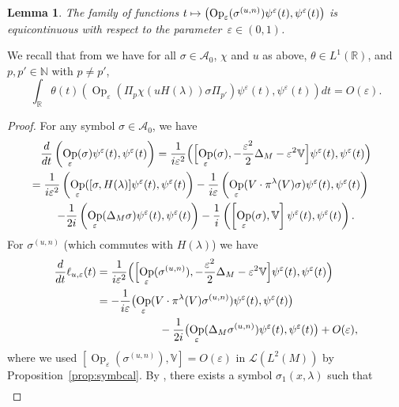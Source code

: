 \documentclass[JEP,XML,SOM,Unicode,published]{cedram}
\let\mathcal\mathscr
\newcommand\mto{\mathchoice{\longmapsto}{\mapsto}{\mapsto}{\mapsto}}
\DeclareMathOperator{\Op}{Op}
\theoremstyle{plain}
\newtheorem{lemma}[theorem]{Lemma}
\theoremstyle{definition}
\let\eps\varepsilon
\def\R{{\mathbb R}}
\def\N{{\mathbb N}}
\def\bbV{{\mathbb V}}
\begin{document}
\begin{lemma}\label{lem:equicontinuity}
The family of functions $t\mto \left(\Op_\eps(\sigma^{(u,n)}) \psi^\eps(t),\psi^\eps(t)\right)$ is equicontinuous with respect to the parameter~$\eps\in(0,1)$.
\end{lemma}

We recall that from \cite[Th.\,2.5(i)]{FF} we have for all $\sigma\in{{\mathcal A}_0}$, $\chi$ and $u$ as above, $\theta\in L^1(\R)$, and $p,p'\in\N$ with $p\not=p'$,
\begin{equation*}%
\int_\R \theta(t) \left(\Op_\eps(\Pi_p \chi(uH(\lambda))\sigma\Pi_{p'}) \psi^\eps(t),\psi^\eps(t)\right) dt = O(\eps).
\end{equation*}

\begin{proof}
For any symbol $\sigma\in{{\mathcal A}_0}$, we have
\begin{multline}\label{eq:d/dt}
\frac d{dt} \left(\Op_\eps(\sigma) \psi^\eps(t),\psi^\eps(t)\right) = \frac 1{i\eps^2} \Bigl(\Bigl[\Op_\eps(\sigma), -\frac {\eps^2} 2 \Delta_M-\eps^2\bbV\Bigr] \psi^\eps(t),\psi^\eps(t)\Bigr)\\
\shoveright{= \frac 1{i\eps^2} \left(\Op_\eps([\sigma, H(\lambda)] \psi^\eps(t),\psi^\eps(t)\right)
-\frac 1{i\eps} \left(\Op_\eps(V\cdot \pi^\lambda(V)\sigma) \psi^\eps(t),\psi^\eps(t)\right)} \\
-\frac {1} {2i} \left(\Op_\eps(\Delta_M \sigma) \psi^\eps(t),\psi^\eps(t)\right) -\frac {1} {i} \left(\left[\Op_\eps(\sigma),\bbV \right] \psi^\eps(t),\psi^\eps(t)\right).
\end{multline}
For $\sigma^{(u,n)}$ (which commutes with $H(\lambda)$) we have
\begin{align*}
\frac d{dt} \ell_{u,\eps}(t) & = \frac 1{i\eps^2} \Bigl(\Bigl[\Op_\eps(\sigma^{(u,n)}), -\frac {\eps^2} 2 \Delta_M -\eps ^2 \bbV\Bigr] \psi^\eps(t),\psi^\eps(t)\Bigr)\\
&=
-\frac 1{i\eps} \bigl(\Op_\eps(V\cdot \pi^\lambda(V)\sigma^{(u,n)}) \psi^\eps(t),\psi^\eps(t)\bigr)\\
&\hspace*{2cm} -\frac {1} {2i} \bigl(\Op_\eps(\Delta_M \sigma^{(u,n)}) \psi^\eps(t),\psi^\eps(t)\bigr) +O(\eps),
\end{align*}
where we used $ [\Op_\eps(\sigma^{(u,n)}), \bbV] =O(\eps) $ in $\mathcal L(L^2(M))$ by Proposition~\ref{prop:symbcal}.
By \cite[Lem.\,4.1]{FF}, there exists a symbol $\sigma_1(x,\lambda)$ such that
\begin{align}

\end{align}
\end{proof}
\end{document}
